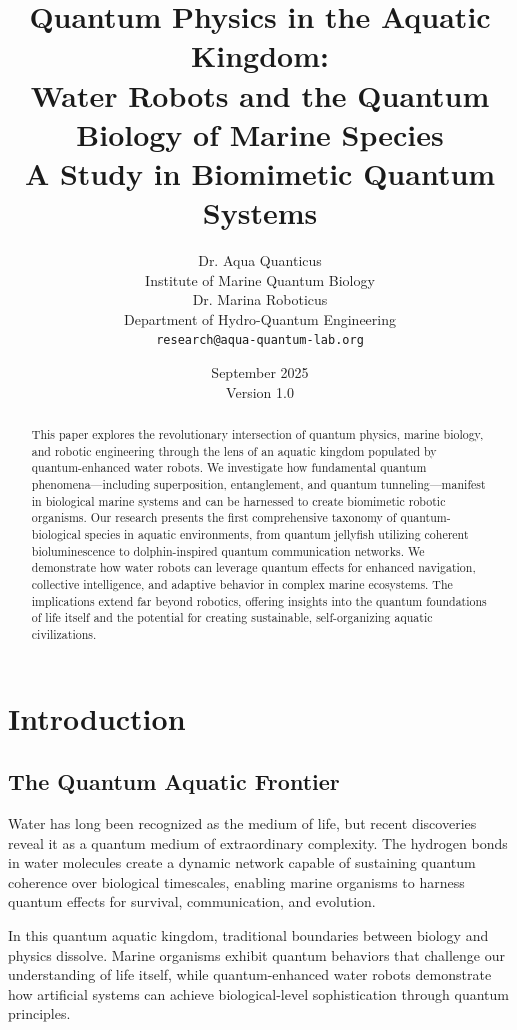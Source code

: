 \documentclass[11pt,a4paper]{article}
\title{\textbf{Quantum Physics in the Aquatic Kingdom:\\ 
Water Robots and the Quantum Biology of Marine Species\\
A Study in Biomimetic Quantum Systems}}
\author{
Dr. Aqua Quanticus \\ 
Institute of Marine Quantum Biology \\
Dr. Marina Roboticus \\
Department of Hydro-Quantum Engineering \\
\texttt{research@aqua-quantum-lab.org}
}
\date{September 2025 \\ Version 1.0}
\begin{document}
\maketitle

\begin{abstract}
This paper explores the revolutionary intersection of quantum physics, marine biology, and robotic engineering through the lens of an aquatic kingdom populated by quantum-enhanced water robots. We investigate how fundamental quantum phenomena—including superposition, entanglement, and quantum tunneling—manifest in biological marine systems and can be harnessed to create biomimetic robotic organisms. Our research presents the first comprehensive taxonomy of quantum-biological species in aquatic environments, from quantum jellyfish utilizing coherent bioluminescence to dolphin-inspired quantum communication networks. We demonstrate how water robots can leverage quantum effects for enhanced navigation, collective intelligence, and adaptive behavior in complex marine ecosystems. The implications extend far beyond robotics, offering insights into the quantum foundations of life itself and the potential for creating sustainable, self-organizing aquatic civilizations.
\end{abstract}

\tableofcontents
\newpage

\section{Introduction}

\subsection{The Quantum Aquatic Frontier}

Water has long been recognized as the medium of life, but recent discoveries reveal it as a quantum medium of extraordinary complexity. The hydrogen bonds in water molecules create a dynamic network capable of sustaining quantum coherence over biological timescales, enabling marine organisms to harness quantum effects for survival, communication, and evolution.

In this quantum aquatic kingdom, traditional boundaries between biology and physics dissolve. Marine organisms exhibit quantum behaviors that challenge our understanding of life itself, while quantum-enhanced water robots demonstrate how artificial systems can achieve biological-level sophistication through quantum principles.
\end{document}
